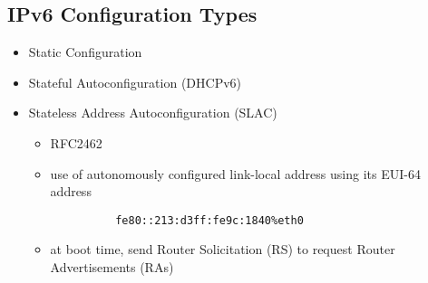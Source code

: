 \documentclass[xga]{xdvislides}
\begin{document}
%

\subsection{IPv6 Configuration Types}
\begin{itemize}
	\item Static Configuration
	\item Stateful Autoconfiguration (DHCPv6)
	\item Stateless Address Autoconfiguration (SLAC)
	\begin{itemize}
		\item RFC2462
		\item use of autonomously configured link-local address
			using its EUI-64 address
\begin{verbatim}
          fe80::213:d3ff:fe9c:1840%eth0
\end{verbatim}
		\item at boot time, send Router Solicitation (RS) to
			request Router Advertisements (RAs)
	\end{itemize}
\end{itemize}
\end{document}
